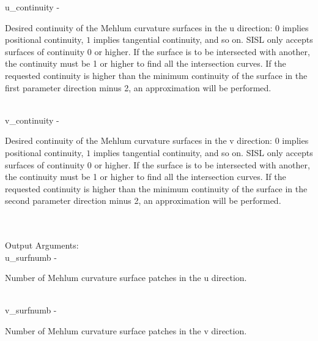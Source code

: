         \>\>    {\fov u\_continuity}\> - \>  \begin{minipg2}
                     Desired continuity of the Mehlum curvature surfaces
                          in the u direction: $0$ implies positional continuity,
                          $1$ implies tangential continuity, and so on.
                          SISL only accepts surfaces of continuity 0 or higher.
                          If the surface is to be intersected with another,
                          the continuity must be 1 or higher to find all the
                          intersection curves. If the requested continuity is higher than
                          the minimum continuity of the surface in the first parameter
                          direction minus 2, an approximation will be performed.
                               \end{minipg2}\\[0.8ex]
        \>\>    {\fov v\_continuity}\> - \>  \begin{minipg2}
                     Desired continuity of the Mehlum curvature surfaces
                          in the v direction: $0$ implies positional continuity,
                          $1$ implies tangential continuity, and so on.
                          SISL only accepts surfaces of continuity 0 or higher.
                          If the surface is to be intersected with another,
                          the continuity must be 1 or higher to find all the
                          intersection curves. If the requested continuity is higher than
                          the minimum continuity of the surface in the second parameter
                          direction minus 2, an approximation will be performed.
                               \end{minipg2}\\[0.8ex]
\\
	\>Output Arguments:\\
        \>\>    {\fov u\_surfnumb}\> - \>  \begin{minipg2}
                     Number of Mehlum curvature surface patches
                          in the u direction.
                               \end{minipg2}\\[0.8ex]
        \>\>    {\fov v\_surfnumb}\> - \>  \begin{minipg2}
                     Number of Mehlum curvature surface patches
                          in the v direction.
                               \end{minipg2}\\[0.8ex]
